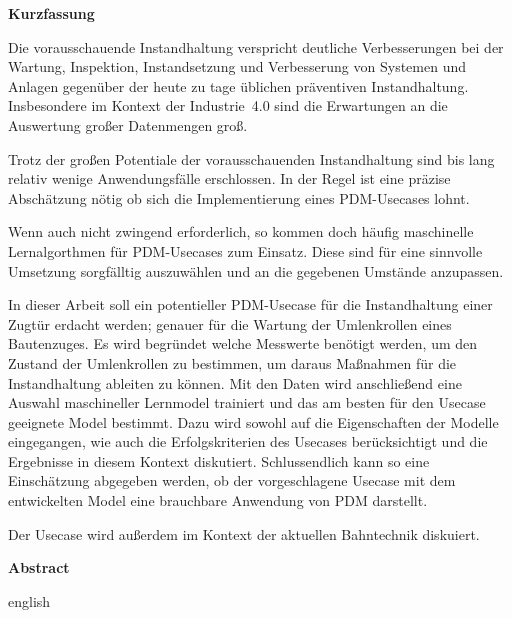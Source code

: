 \begin{center}
	\textbf{Kurzfassung}
\end{center}
\raggedright
Die vorausschauende Instandhaltung verspricht deutliche Verbesserungen bei der Wartung, Inspektion, Instandsetzung und Verbesserung von Systemen und Anlagen gegenüber der heute zu tage üblichen präventiven Instandhaltung. Insbesondere im Kontext der Industrie~\num{4.0} sind die Erwartungen an die Auswertung großer Datenmengen groß.

Trotz der großen Potentiale der vorausschauenden Instandhaltung sind bis lang relativ wenige Anwendungsfälle erschlossen. In der Regel ist eine präzise Abschätzung nötig ob sich die Implementierung eines PDM-Usecases lohnt.

Wenn auch nicht zwingend erforderlich, so kommen doch häufig maschinelle Lernalgorthmen für PDM-Usecases zum Einsatz. Diese sind für eine sinnvolle Umsetzung sorgfälltig auszuwählen und an die gegebenen Umstände anzupassen.

In dieser Arbeit soll ein potentieller PDM-Usecase für die Instandhaltung einer Zugtür erdacht werden; genauer für die Wartung der Umlenkrollen eines Bautenzuges. Es wird begründet welche Messwerte benötigt werden, um den Zustand der Umlenkrollen zu bestimmen, um daraus Maßnahmen für die Instandhaltung ableiten zu können. Mit den Daten wird anschließend eine Auswahl maschineller Lernmodel trainiert und das am besten für den Usecase geeignete Model bestimmt. Dazu wird sowohl auf die Eigenschaften der Modelle eingegangen, wie auch die Erfolgskriterien des Usecases berücksichtigt und die Ergebnisse in diesem Kontext diskutiert. Schlussendlich kann so eine Einschätzung abgegeben werden, ob der vorgeschlagene Usecase mit dem entwickelten Model eine brauchbare Anwendung von PDM darstellt.

Der Usecase wird außerdem im Kontext der aktuellen Bahntechnik diskuiert.
\clearpage
\begin{center}
	\textbf{Abstract}
\end{center}
\raggedright
english
\clearpage